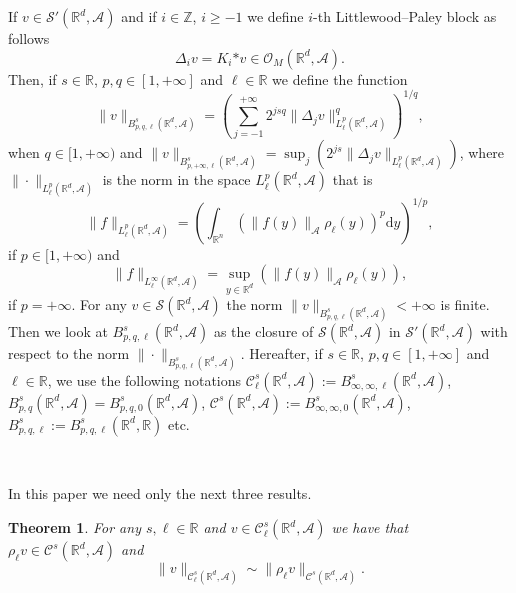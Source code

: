 \documentclass{article}
\newcommand{\assign}{:=}
\newcommand{\asterisk}{\mathord{*}}
\newcommand{\mathd}{\mathrm{d}}
\newtheorem{theorem}{Theorem}
\begin{document}
If $v \in \mathcal{S}' (\mathbb{R}^d, \mathcal{A})$ and if $i \in \mathbb{Z}$,
$i \geqslant - 1$ we define $i$-th Littlewood--Paley block as follows
\[ \Delta_i v = K_i \asterisk v \in \mathcal{O}_M (\mathbb{R}^d, \mathcal{A})
   . \]
Then, if $s \in \mathbb{R}$, $p, q \in [1, + \infty]$ and $\ell \in
\mathbb{R}$ we define the function
\[ \| v \|_{B^s_{p, q, \ell} (\mathbb{R}^d, \mathcal{A})} = \left( \sum_{j = -
   1}^{+ \infty} 2^{j s q} \| \Delta_j v \|_{L^p_{\ell} (\mathbb{R}^d,
   \mathcal{A})}^q \right)^{1 / q}, \]
when $q \in [1, + \infty)$ and $\| v \|_{B^s_{p, + \infty, \ell}
(\mathbb{R}^d, \mathcal{A})} = \sup_j (2^{j s} \| \Delta_j v \|_{L^p_{\ell}
(\mathbb{R}^d, \mathcal{A})})$, where $\| \cdot \|_{L^p_{\ell} (\mathbb{R}^d,
\mathcal{A})}$ is the norm in the space $L_{\ell}^p (\mathbb{R}^d,
\mathcal{A})$ that is
\[ \| f \|_{L^p_{\ell} (\mathbb{R}^d, \mathcal{A})} = \left(
   \int_{\mathbb{R}^n} (\| f (y) \|_{\mathcal{A}} \rho_{\ell} (y))^p \mathd y
   \right)^{1 / p}, \]
if $p \in [1, + \infty)$ and
\[ \| f \|_{L^{\infty}_{\ell} (\mathbb{R}^d, \mathcal{A})} = \sup_{y \in
   \mathbb{R}^d} (\| f (y) \|_{\mathcal{A}} \rho_{\ell} (y)), \]
if $p = + \infty$. For any $v \in \mathcal{S} (\mathbb{R}^d, \mathcal{A})$ the
norm $\| v \|_{B^s_{p, q, \ell} (\mathbb{R}^d, \mathcal{A})} < + \infty$ is
finite. Then we look at $B^s_{p, q, \ell} (\mathbb{R}^d, \mathcal{A})$ as the
closure of $\mathcal{S} (\mathbb{R}^d, \mathcal{A})$ in $\mathcal{S}'
(\mathbb{R}^d, \mathcal{A})$ with respect to the norm $\| \cdot \|_{B^s_{p, q,
\ell} (\mathbb{R}^d, \mathcal{A})}$. Hereafter, if $s \in \mathbb{R}$, $p, q
\in [1, + \infty]$ and $\ell \in \mathbb{R}$, we use the following notations
$\mathcal{C}^s_{\ell} (\mathbb{R}^d, \mathcal{A}) \assign B^s_{\infty, \infty,
\ell} (\mathbb{R}^d, \mathcal{A})$, $B^s_{p, q} (\mathbb{R}^d, \mathcal{A}) =
B^s_{p, q, 0} (\mathbb{R}^d, \mathcal{A})$, $\mathcal{C}^s (\mathbb{R}^d,
\mathcal{A}) \assign B^s_{\infty, \infty, 0} (\mathbb{R}^d, \mathcal{A})$,
$B^s_{p, q, \ell} \assign B^s_{p, q, \ell} (\mathbb{R}^d, \mathbb{R})$ etc.

\

In this paper we need only the next three results.

\begin{theorem}
  \label{theorem_weight}For any $s, \ell \in \mathbb{R}$ and $v \in
  \mathcal{C}^s_{\ell} (\mathbb{R}^d, \mathcal{A})$ we have that $\rho_{\ell}
  v \in \mathcal{C}^s (\mathbb{R}^d, \mathcal{A})$ and
  \[ \| v \|_{\mathcal{C}^s_{\ell} (\mathbb{R}^d, \mathcal{A})} \sim \|
     \rho_{\ell} v \|_{\mathcal{C}^s (\mathbb{R}^d, \mathcal{A})} . \]
\end{theorem}
\end{document}
